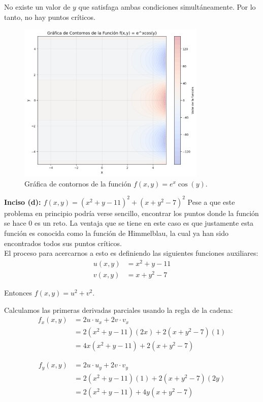\documentclass{article}
\begin{document}
No existe un valor de $y$ que satisfaga ambas condiciones simultáneamente. Por lo tanto, no hay puntos críticos.

\begin{figure}[h]
\centering
\includegraphics[width=0.8\textwidth]{images/6c_plot.png}
\caption{Gráfica de contornos de la función $f(x,y) = e^{x}\cos(y)$.}
\label{fig:6a_contour}
\end{figure}

\textbf{Inciso (d): $f(x,y) = (x^{2} + y - 11)^{2} + (x + y^{2} - 7)^{2}$}
Pese a que este problema en principio podría verse sencillo, encontrar los puntos donde la función se hace $0$ es un reto. La ventaja que se tiene en este caso es que justamente esta función es conocida como la función de Himmelblau, la cual ya han sido encontrados todos sus puntos críticos.\\
El proceso para acercarnos a esto es definiendo las siguientes funciones auxiliares:
\begin{align}
u(x,y) &= x^2 + y - 11 \\
v(x,y) &= x + y^2 - 7
\end{align}

Entonces $f(x,y) = u^2 + v^2$.

Calculamos las primeras derivadas parciales usando la regla de la cadena:
\begin{align}
f_x(x,y) &= 2u \cdot u_x + 2v \cdot v_x \\
&= 2(x^2 + y - 11)(2x) + 2(x + y^2 - 7)(1) \\
&= 4x(x^2 + y - 11) + 2(x + y^2 - 7)
\end{align}

\begin{align}
f_y(x,y) &= 2u \cdot u_y + 2v \cdot v_y \\
&= 2(x^2 + y - 11)(1) + 2(x + y^2 - 7)(2y) \\
&= 2(x^2 + y - 11) + 4y(x + y^2 - 7)
\end{align}
\end{document}
